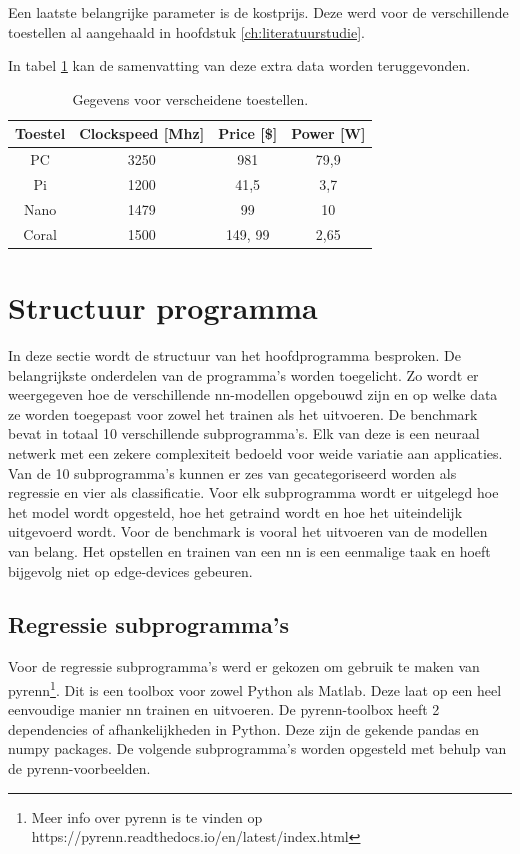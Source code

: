 Een laatste belangrijke parameter is de kostprijs. Deze werd voor de verschillende toestellen al aangehaald in hoofdstuk \ref{ch:literatuurstudie}.
	
In tabel \ref{tab:datadevices} kan de samenvatting van deze extra data worden teruggevonden. 
	
	\begin{table}[]
		\centering
		\begin{tabular}{cccc}
			\hline
			Toestel                    & Clockspeed {[}Mhz{]} & Price {[}\${]} & Power {[}W{]} \\ \hline
			\multicolumn{1}{c|}{PC}    & 3250                 & 981            & 79,9          \\
			\multicolumn{1}{c|}{Pi}    & 1200                 & 41,5           & 3,7           \\
			\multicolumn{1}{c|}{Nano}  & 1479                 & 99             & 10            \\
			\multicolumn{1}{c|}{Coral} & 1500                 & 149, 99        & 2,65          \\ \hline
		\end{tabular}
		\caption{Gegevens voor verscheidene toestellen.}
		\label{tab:datadevices}
	\end{table}




\section{Structuur programma}
In deze sectie wordt de structuur van het hoofdprogramma besproken. De belangrijkste onderdelen van de programma's worden toegelicht. Zo wordt er weergegeven hoe de verschillende \gls{nn}-modellen opgebouwd zijn en op welke data ze worden toegepast voor zowel het trainen als het uitvoeren. De benchmark bevat in totaal 10 verschillende subprogramma's. Elk van deze is een neuraal netwerk met een zekere complexiteit bedoeld voor weide variatie aan applicaties. Van de 10 subprogramma's kunnen er zes van gecategoriseerd worden als regressie en vier als classificatie. Voor elk subprogramma wordt er uitgelegd hoe het model wordt opgesteld, hoe het getraind wordt en hoe het uiteindelijk uitgevoerd wordt. Voor de benchmark is vooral het uitvoeren van de modellen van belang. Het opstellen en trainen van een \gls{nn} is een eenmalige taak en hoeft bijgevolg niet op edge-devices gebeuren.


	\subsection{Regressie subprogramma's}
	Voor de regressie subprogramma's werd er gekozen om gebruik te maken van pyrenn\footnote{Meer info over pyrenn is te vinden op https://pyrenn.readthedocs.io/en/latest/index.html}. Dit is een toolbox voor zowel Python als Matlab. Deze laat op een heel eenvoudige manier \gls{nn} trainen en uitvoeren. De pyrenn-toolbox heeft 2 dependencies of afhankelijkheden in Python. Deze zijn de gekende pandas en numpy packages.  De volgende subprogramma's worden opgesteld met behulp van de pyrenn-voorbeelden. 

